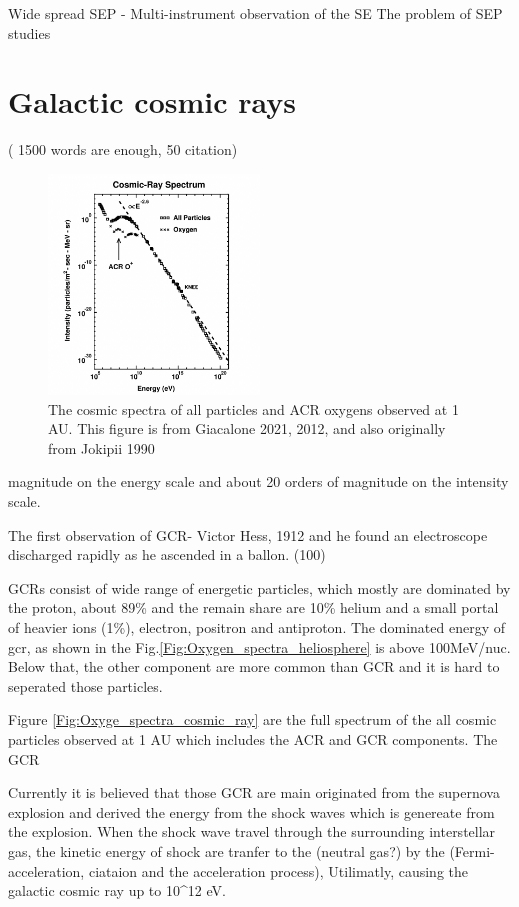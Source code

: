 Wide spread SEP
	- 
Multi-instrument observation of the SE
The problem of SEP studies



\section{Galactic cosmic rays} ( 1500 words are enough, 50 citation)

\begin{figure}
	\centering
	\includegraphics[width = 0.5\textwidth]{images/oxygen_cosmic-ray spectrum.png}
	
	\caption{The cosmic spectra of all particles and ACR oxygens observed at 1 AU. This figure is from Giacalone 2021, 2012, and also originally from Jokipii 1990}
	\label{Fig:Oxygen_spectra_cosmic_ray}
\end{figure}


magnitude on the energy scale and about 20 orders of magnitude on the intensity scale.

The first observation of GCR- Victor Hess, 1912 and he found an electroscope discharged rapidly as he ascended in a ballon.
  (100)
  

GCRs consist of wide range of energetic particles,  which mostly are dominated by the proton, about 89\%  and the remain share are 10\% helium and a small portal of heavier ions (1\%), electron, positron and antiproton. The dominated energy of gcr, as shown in the Fig.\ref{Fig:Oxygen_spectra_heliosphere} is above 100MeV/nuc. Below that, the other component are more common than GCR and it is hard to seperated those particles.

Figure \ref{Fig:Oxyge_spectra_cosmic_ray} are the full spectrum of the all cosmic particles observed at 1 AU which includes the ACR and GCR components.  The GCR


Currently it is believed that those GCR are main originated from the supernova explosion and derived the energy from the shock waves which is genereate from the explosion. When the shock wave travel through the surrounding interstellar gas, the kinetic energy of shock are tranfer to the  (neutral gas?) by the (Fermi-acceleration, ciataion and the acceleration process), Utilimatly, causing the galactic cosmic ray up to 10^12 eV.

